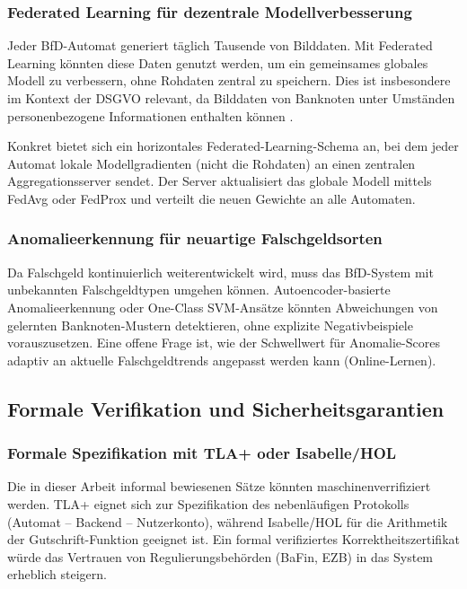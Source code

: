 ﻿\documentclass[a4paper,12pt]{article}
\theoremstyle{definition}
\begin{document}
\subsubsection{Federated Learning für dezentrale Modellverbesserung}

Jeder BfD-Automat generiert täglich Tausende von Bilddaten.
Mit Federated Learning könnten diese Daten genutzt werden, um ein
gemeinsames globales Modell zu verbessern, ohne Rohdaten zentral zu speichern.
Dies ist insbesondere im Kontext der DSGVO relevant, da Bilddaten von
Banknoten unter Umständen personenbezogene Informationen enthalten können \cite{konecny2016}.

Konkret bietet sich ein horizontales Federated-Learning-Schema an,
bei dem jeder Automat lokale Modellgradienten (nicht die Rohdaten) an
einen zentralen Aggregationsserver sendet.  Der Server aktualisiert das
globale Modell mittels FedAvg oder FedProx \cite{li2020federated} und
verteilt die neuen Gewichte an alle Automaten.

\subsubsection{Anomalieerkennung für neuartige Falschgeldsorten}

Da Falschgeld kontinuierlich weiterentwickelt wird, muss das BfD-System
mit unbekannten Falschgeldtypen umgehen können.
Autoencoder-basierte Anomalieerkennung \cite{hinton2006reducing} oder
One-Class SVM-Ansätze könnten Abweichungen von gelernten Banknoten-Mustern
detektieren, ohne explizite Negativbeispiele vorauszusetzen.
Eine offene Frage ist, wie der Schwellwert für Anomalie-Scores adaptiv
an aktuelle Falschgeldtrends angepasst werden kann (Online-Lernen).

\subsection{Formale Verifikation und Sicherheitsgarantien}

\subsubsection{Formale Spezifikation mit TLA+ oder Isabelle/HOL}

Die in dieser Arbeit informal bewiesenen Sätze könnten maschinenverrifiziert
werden.  TLA+ \cite{lamport2002specifying} eignet sich zur Spezifikation des
nebenläufigen Protokolls (Automat -- Backend -- Nutzerkonto), während
Isabelle/HOL \cite{nipkow2002isabelle} für die Arithmetik der Gutschrift-Funktion
geeignet ist.  Ein formal verifiziertes Korrektheitszertifikat würde das Vertrauen
von Regulierungsbehörden (BaFin, EZB) in das System erheblich steigern.
\end{document}

